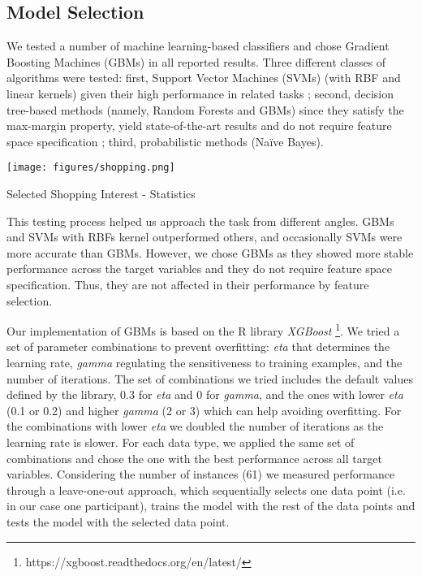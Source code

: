 \subsection{Model Selection}
We tested a number of machine learning-based classifiers and chose Gradient Boosting Machines (GBMs) in all reported results. Three different classes of algorithms were tested: first, Support Vector Machines (SVMs) (with RBF and linear kernels) given their high performance in related tasks \cite{chittaranjan2013mining, matic2015boredom, de2013predicting}; second, decision tree-based methods (namely, Random Forests and GBMs) since they satisfy the max-margin property, yield state-of-the-art results and do not require feature space specification \cite{breiman2001random}; third, probabilistic methods (Na{\" i}ve Bayes). 

\begin{table}
  \texttt{[image: figures/shopping.png]}
  \caption{Selected Shopping Interest - Statistics}
  \label{tbl:four}
\end{table}

This testing process helped us approach the task from different angles. GBMs and SVMs with RBFs kernel outperformed others, and occasionally SVMs were more accurate than GBMs. However, we chose GBMs as they showed more stable performance across the target variables and they do not require feature space specification. Thus, they are not affected in their performance by feature selection. 

Our implementation of GBMs is based on the R library \textit{XGBoost}
\footnote{https://xgboost.readthedocs.org/en/latest/}. 
We tried a set of parameter combinations to prevent overfitting: \textit{eta} that determines the learning rate, \textit{gamma} regulating the sensitiveness to training examples, and the number of iterations. The set of combinations we tried includes the default values defined by the library, 0.3 for \textit{eta} and 0 for \textit{gamma}, and the ones with lower \textit{eta} (0.1 or 0.2) and higher \textit{gamma} (2 or 3) which can help avoiding overfitting. For the combinations with lower \textit{eta} we doubled the number of iterations as the learning rate is slower. For each data type, we applied the same set of combinations and chose the one with the best performance across all target variables. Considering the number of instances (61) we measured performance through a leave-one-out approach, which sequentially selects one data point (i.e. in our case one participant), trains the model with the rest of the data points and tests the model with the selected data point. 



